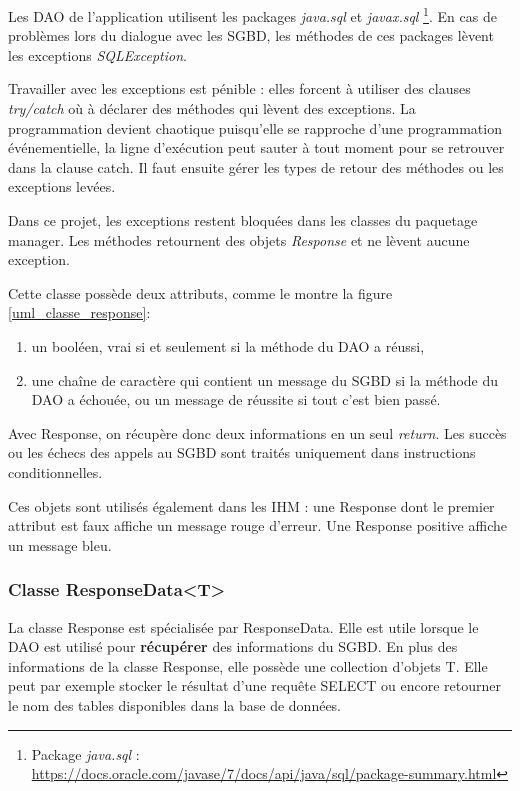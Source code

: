 Les DAO de l'application utilisent les packages \textit{java.sql} et \textit{javax.sql}
\footnote{\label{paquetages_sql}Package \textit{java.sql} : \url{https://docs.oracle.com/javase/7/docs/api/java/sql/package-summary.html}}.
En cas de problèmes lors du dialogue avec les SGBD, les méthodes de ces packages lèvent les exceptions \textit{SQLException}.

Travailler avec les exceptions est pénible : elles forcent à utiliser des clauses \textit{try/catch} où à déclarer des méthodes qui lèvent des exceptions.
La programmation devient chaotique puisqu'elle se rapproche d'une programmation événementielle, la ligne d'exécution peut sauter à tout moment pour se retrouver dans la clause catch.
Il faut ensuite gérer les types de retour des méthodes ou les exceptions levées.

Dans ce projet, les exceptions restent bloquées dans les classes du paquetage manager.
Les méthodes retournent des objets \textit{Response} et ne lèvent aucune exception.

Cette classe possède deux attributs, comme le montre la figure \ref{uml_classe_response}:
\begin{enumerate}
\item un booléen, vrai si et seulement si la méthode du DAO a réussi,
\item une chaîne de caractère qui contient un message du SGBD si la méthode du DAO a échouée, ou un message de réussite si tout c'est bien passé.
\end{enumerate}

Avec Response, on récupère donc deux informations en un seul \textit{return}.
Les succès ou les échecs des appels au SGBD sont traités uniquement dans instructions conditionnelles.

Ces objets sont utilisés également dans les IHM : une Response dont le premier attribut est faux affiche un message rouge d'erreur.
Une Response positive affiche un message bleu.

\subsubsection{Classe ResponseData<T>}
La classe Response est spécialisée par ResponseData.
Elle est utile lorsque le DAO est utilisé pour \textbf{récupérer} des informations du SGBD.
En plus des informations de la classe Response, elle possède une collection d'objets T.
Elle peut par exemple stocker le résultat d'une requête SELECT ou encore retourner le nom des tables disponibles dans la base de données.

